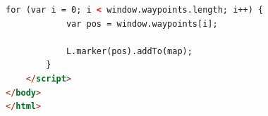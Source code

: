 \documentclass[simple,a4paper,14pt,ukrainian,utf8]{eskdtext}
\begin{document}
\begin{appendices}
\begin{small}
\begin{lstlisting}[language=html]
		for (var i = 0; i < window.waypoints.length; i++) {
			var pos = window.waypoints[i];

			L.marker(pos).addTo(map);
		}
	</script>
</body>
</html>
\end{lstlisting}
\end{small}

\end{appendices}

\clearpage \newpage

\renewcommand\bibname{Використана література}

\end{document}
